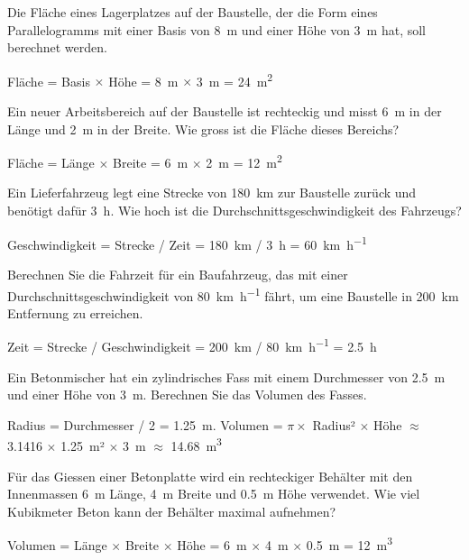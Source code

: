 \begin{questions}
   \question Die Fläche eines Lagerplatzes auf der Baustelle, der die Form eines Parallelogramms mit einer Basis von \SI{8}{\metre} und einer Höhe von \SI{3}{\metre} hat, soll berechnet werden.
    \begin{solution}
    Fläche = Basis $\times$ Höhe = \SI{8}{\metre} $\times$ \SI{3}{\metre} = \SI{24}{\square\metre}
    \end{solution}

    \question Ein neuer Arbeitsbereich auf der Baustelle ist rechteckig und misst \SI{6}{\metre} in der Länge und \SI{2}{\metre} in der Breite. Wie gross ist die Fläche dieses Bereichs?
    \begin{solution}
    Fläche = Länge $\times$ Breite = \SI{6}{\metre} $\times$ \SI{2}{\metre} = \SI{12}{\square\metre}
    \end{solution}

    \question Ein Lieferfahrzeug legt eine Strecke von \SI{180}{\kilo\metre} zur Baustelle zurück und benötigt dafür \SI{3}{\hour}. Wie hoch ist die Durchschnittsgeschwindigkeit des Fahrzeugs?
    \begin{solution}
    Geschwindigkeit = Strecke / Zeit = \SI{180}{\kilo\metre} / \SI{3}{\hour} = \SI{60}{\kilo\metre\per\hour}
    \end{solution}

    \question Berechnen Sie die Fahrzeit für ein Baufahrzeug, das mit einer Durchschnittsgeschwindigkeit von \SI{80}{\kilo\metre\per\hour} fährt, um eine Baustelle in \SI{200}{\kilo\metre} Entfernung zu erreichen.
    \begin{solution}
    Zeit = Strecke / Geschwindigkeit = \SI{200}{\kilo\metre} / \SI{80}{\kilo\metre\per\hour} = \SI{2.5}{\hour}
    \end{solution}

    \question Ein Betonmischer hat ein zylindrisches Fass mit einem Durchmesser von \SI{2.5}{\metre} und einer Höhe von \SI{3}{\metre}. Berechnen Sie das Volumen des Fasses.
    \begin{solution}
    Radius = Durchmesser / 2 = \SI{1.25}{\metre}. Volumen = $\pi \times$ Radius² $\times$ Höhe $\approx$ 3.1416 $\times$ \SI{1.25}{\metre}² $\times$ \SI{3}{\metre} $\approx$ \SI{14.68}{\cubic\metre}
    \end{solution}

    \question Für das Giessen einer Betonplatte wird ein rechteckiger Behälter mit den Innenmassen \SI{6}{\metre} Länge, \SI{4}{\metre} Breite und \SI{0.5}{\metre} Höhe verwendet. Wie viel Kubikmeter Beton kann der Behälter maximal aufnehmen?
    \begin{solution}
    Volumen = Länge $\times$ Breite $\times$ Höhe = \SI{6}{\metre} $\times$ \SI{4}{\metre} $\times$ \SI{0.5}{\metre} = \SI{12}{\cubic\metre}
    \end{solution}
    \end{questions}

